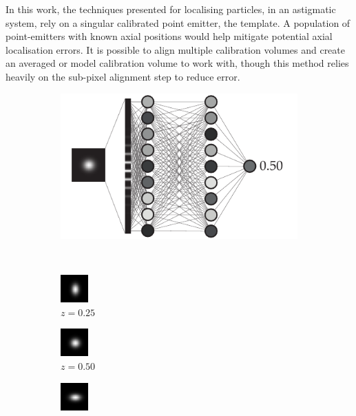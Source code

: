 In this work, the techniques presented for localising particles, in an astigmatic system, rely on a singular calibrated point emitter, the template.
A population of point-emitters with known axial positions would help mitigate potential axial localisation errors.
It is possible to align multiple calibration volumes and create an averaged or model calibration volume to work with, though this method relies heavily on the sub-pixel alignment step to reduce error.

\begin{figure}
    \centering
    \begin{subfigure}[t]{\linewidth}
        \centering
        \includegraphics{nn_astig_scheme_sub}
        \caption{}
    \end{subfigure}\\\vspace{\abovecaptionskip}
    \begin{subfigure}[t]{0.2\linewidth}
        \centering
        \includegraphics[width=1.06cm]{nn/4}
        \caption{\(z=0.25\)}
    \end{subfigure}\quad
    \begin{subfigure}[t]{0.2\linewidth}
        \centering
        \includegraphics[width=1.06cm]{nn/8}
        \caption{\(z=0.50\)}
    \end{subfigure}\quad
    \begin{subfigure}[t]{0.2\linewidth}
        \centering
        \includegraphics[width=1.06cm]{nn/12}

\end{subfigure}
\end{figure}
